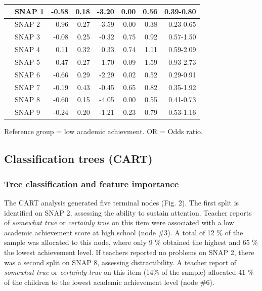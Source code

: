 \documentclass[10pt,letterpaper]{article}
\begin{document}
\begin{table}[H]
\begin{tabular}{|llrrrr|rr|}
 \hline
  & SNAP 1 & -0.58 & 0.18 & -3.20 & 0.00 & 0.56 & 0.39-0.80 \\ 
  \hline
  & SNAP 2 & -0.96 & 0.27 & -3.59 & 0.00 & 0.38 & 0.23-0.65 \\ 
  \hline
  & SNAP 3 & -0.08 & 0.25 & -0.32 & 0.75 & 0.92 & 0.57-1.50 \\ 
  \hline
  & SNAP 4 & 0.11 & 0.32 & 0.33 & 0.74 & 1.11 & 0.59-2.09 \\ 
  \hline
  & SNAP 5 & 0.47 & 0.27 & 1.70 & 0.09 & 1.59 & 0.93-2.73 \\ 
  \hline 
  & SNAP 6 & -0.66 & 0.29 & -2.29 & 0.02 & 0.52 & 0.29-0.91 \\ 
   \hline
  & SNAP 7 & -0.19 & 0.43 & -0.45 & 0.65 & 0.82 & 0.35-1.92 \\ 
  \hline
  & SNAP 8 & -0.60 & 0.15 & -4.05 & 0.00 & 0.55 & 0.41-0.73 \\ 
  \hline
  & SNAP 9 & -0.24 & 0.20 & -1.21 & 0.23 & 0.79 & 0.53-1.16 \\ 
   \hline

\end{tabular}
\begin{center}
Reference group = low academic achievment. OR = Odds ratio.\\ 
\end{center}
\end{table}
\vspace{5mm}

  \subsection*{Classification trees (CART)}

\subsubsection*{Tree classification and feature importance}
 The CART analysis generated five terminal nodes (Fig. 2). The first split is identified on SNAP 2, assessing the ability to sustain attention. Teacher reports of \emph{somewhat true} or \emph{certainly true}  on this item were associated with a low academic achievement score at high school (node \#3). A total of 12 \% of the sample was allocated to this node, where only 9 \% obtained the highest and 65 \% the lowest achievement level. If teachers reported no problems on SNAP 2, there was a second split on SNAP 8, assessing distractibility. A teacher report of \emph{somewhat true} or \emph{certainly true}  on this item (14\% of the sample) allocated 41 \% of the children to the lowest academic achievement level (node \#6). 
 
\end{document}
